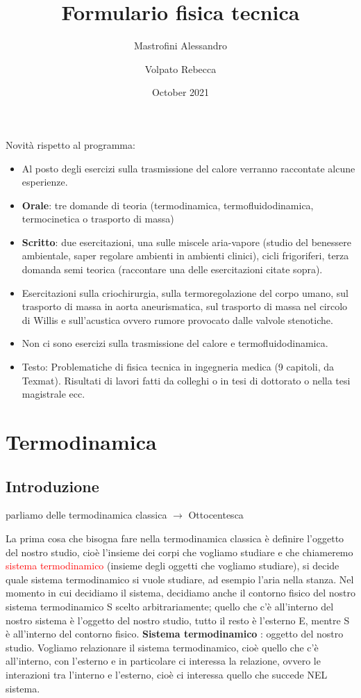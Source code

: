 \documentclass[a4paper]{article}
\title{Formulario fisica tecnica}
\author{
	Mastrofini Alessandro\\
	\and
	Volpato Rebecca\\
}
\date{October 2021}
\numberwithin{equation}{section}%
\begin{document}
\newpage
\maketitle
\newpage
\tableofcontents
\newpage	

\newpage 

Novità rispetto al programma:
\begin{itemize}
	\item Al posto degli esercizi sulla trasmissione del calore verranno raccontate alcune esperienze.
	\item 	\textbf{Orale}: tre domande di teoria (termodinamica, termofluidodinamica, termocinetica o trasporto di massa) 
	\item \textbf{Scritto}: due esercitazioni, una sulle miscele aria-vapore (studio del benessere ambientale, saper regolare ambienti in ambienti clinici), cicli frigoriferi, terza domanda semi teorica (raccontare una delle esercitazioni citate sopra). 
	\item Esercitazioni sulla criochirurgia, sulla termoregolazione del corpo umano, sul trasporto di massa in aorta aneurismatica, sul trasporto di massa nel circolo di Willis e sull’acustica ovvero rumore provocato dalle valvole stenotiche. 
	\item Non ci sono esercizi sulla trasmissione del calore e termofluidodinamica.
	\item Testo: Problematiche di fisica tecnica in ingegneria medica (9 capitoli, da Texmat). Risultati di lavori fatti da colleghi o in tesi di dottorato o nella tesi magistrale ecc.
	
\end{itemize}


\newpage 


\section{Termodinamica}
\subsection{Introduzione}
	
parliamo delle termodinamica classica $\rightarrow$ Ottocentesca


La prima cosa che bisogna fare nella termodinamica classica è definire l’oggetto del nostro studio, cioè l’insieme dei corpi che vogliamo studiare e che chiameremo \textcolor{red}{sistema termodinamico} (insieme degli oggetti che vogliamo studiare), si decide quale sistema termodinamico si vuole studiare, ad esempio l’aria nella stanza.
Nel momento in cui decidiamo il sistema, decidiamo anche il contorno fisico del nostro sistema termodinamico S scelto arbitrariamente; quello che c’è all’interno del nostro sistema è l’oggetto del nostro studio, tutto il resto è l’esterno E, mentre S è all’interno del contorno fisico.
\textbf{Sistema termodinamico} : oggetto del nostro studio.
Vogliamo relazionare il sistema termodinamico, cioè quello che c’è all’interno, con l’esterno e in particolare ci interessa la relazione, ovvero le interazioni tra l’interno e l’esterno, cioè ci interessa quello che succede NEL sistema.
\end{document}
